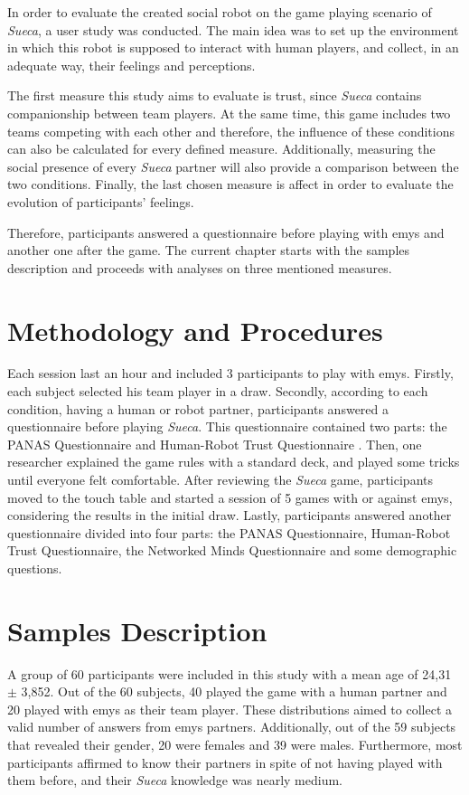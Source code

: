 \label{chapter:results}

In order to evaluate the created social robot on the game playing scenario of \emph{Sueca}, a user study was conducted.
The main idea was to set up the environment in which this robot is supposed to interact with human players, and collect, in an adequate way, their feelings and perceptions.

The first measure this study aims to evaluate is trust, since \emph{Sueca} contains companionship between team players.
At the same time, this game includes two teams competing with each other and therefore, the influence of these conditions can also be calculated for every defined measure.
Additionally, measuring the social presence of every \emph{Sueca} partner will also provide a comparison between the two conditions.
Finally, the last chosen measure is affect in order to evaluate the evolution of participants' feelings.

Therefore, participants answered a questionnaire before playing with \ac{emys} and another one after the game.
The current chapter starts with the samples description and proceeds with analyses on three mentioned measures.

\section{Methodology and Procedures}
Each session last an hour and included 3 participants to play with \ac{emys}.
Firstly, each subject selected his team player in a draw.
Secondly, according to each condition, having a human or robot partner, participants answered a questionnaire before playing \emph{Sueca}.
This questionnaire contained two parts: the PANAS Questionnaire \cite{Egloff1998} and Human-Robot Trust Questionnaire \cite{Schaefer2013}.
Then, one researcher explained the game rules with a standard deck, and played some tricks until everyone felt comfortable.
After reviewing the \emph{Sueca} game, participants moved to the touch table and started a session of 5 games with or against \ac{emys}, considering the results in the initial draw.
Lastly, participants answered another questionnaire divided into four parts: the PANAS Questionnaire, Human-Robot Trust Questionnaire, the Networked Minds Questionnaire \cite{Harms2004} and some demographic questions.

\section{Samples Description}
\label{sec:samples}
A group of 60 participants were included in this study with a mean age of 24,31 $\pm$ 3,852.
Out of the 60 subjects, 40 played the game with a human partner and 20 played with \ac{emys} as their team player.
These distributions aimed to collect a valid number of answers from \ac{emys} partners.
Additionally, out of the 59 subjects that revealed their gender, 20 were females and 39 were males.
Furthermore, most participants affirmed to know their partners in spite of not having played with them before, and their \emph{Sueca} knowledge was nearly medium.

